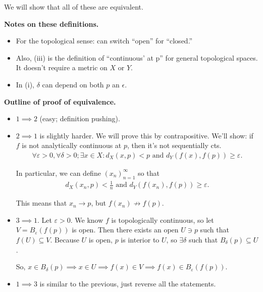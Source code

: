 \documentclass[12pt]{article}
\newcommand{\eps}{\epsilon}
\begin{document}
     We will show that all of these are equivalent.

     {\bf Notes on these definitions.}

     \begin{itemize}
       \item For the topological sense: can switch ``open'' for ``closed.''  
       \item Also, (iii) is the definition of ``continuous' at p'' for general topological spaces.  It doesn't require a metric on $X$ or $Y$.
        \item In (i), $\delta$ can depend on both $p$ an $\eps$.
     \end{itemize}

    {\bf Outline of proof of equivalence.}

    \begin{itemize}
      \item $1 \implies 2$ (easy; definition pushing).
      \item $2 \implies 1$ is slightly harder.  We will prove this by contrapositive.  We'll show: if $f$ is not analytically continuous at $p$, then it's not sequentially cts.
        \begin{align*}
          \forall \varepsilon > 0, \forall \delta > 0; \exists x \in X: d_X(x, p) < p \text{ and } d_Y (f(x), f(p)) \geq \varepsilon.
        \end{align*}

        In particular, we can define $(x_n)_{n=1}^{\infty}$ so that
        \begin{align*}
          d_X(x_n, p) < \frac{1}{n} \text{ and } d_Y (f(x_n), f(p)) \geq \varepsilon.
        \end{align*}

        This means that $x_n \to p$, but $f(x_n) \not \to f(p)$.
      \item $3 \implies 1$. Let $\varepsilon > 0$. We know $f$ is topologically continuous, so let $V = B_{\varepsilon}(f(p))$ is open.  Then there exists an open $U \ni p$ such that $f(U) \subseteq V$.  Because $U$ is open, $p$ is interior to $U$, so $\exists \delta$ such that $B_{\delta}(p) \subseteq U$.

        So, $x \in B_{\delta}(p) \implies x \in U \implies f(x) \in V \implies f(x) \in B_{\varepsilon} (f(p))$.

      \item $1 \implies 3$ is similar to the previous, just reverse all the statements.
    \end{itemize}
\end{document}
